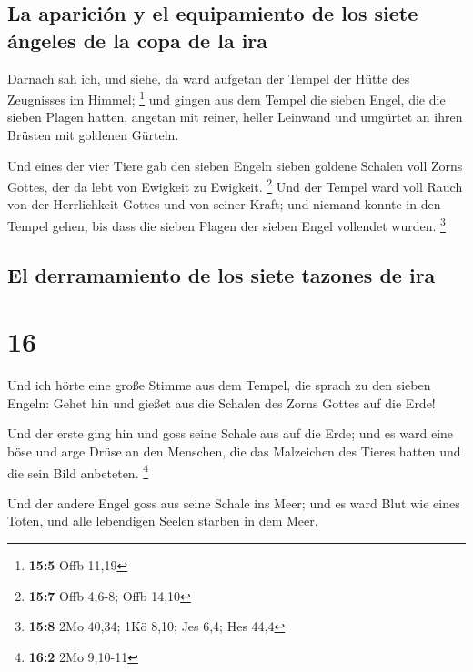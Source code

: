 \hypertarget{la-apariciuxf3n-y-el-equipamiento-de-los-siete-uxe1ngeles-de-la-copa-de-la-ira}{%
\subsection{La aparición y el equipamiento de los siete ángeles de la
copa de la
ira}\label{la-apariciuxf3n-y-el-equipamiento-de-los-siete-uxe1ngeles-de-la-copa-de-la-ira}}

 Darnach sah ich, und siehe, da ward aufgetan der Tempel
der Hütte des Zeugnisses im Himmel; \footnote{\textbf{15:5} Offb 11,19}
 und gingen aus dem Tempel die sieben Engel, die die
sieben Plagen hatten, angetan mit reiner, heller Leinwand und umgürtet
an ihren Brüsten mit goldenen Gürteln.

 Und eines der vier Tiere gab den sieben Engeln sieben
goldene Schalen voll Zorns Gottes, der da lebt von Ewigkeit zu Ewigkeit.
\footnote{\textbf{15:7} Offb 4,6-8; Offb 14,10}  Und der
Tempel ward voll Rauch von der Herrlichkeit Gottes und von seiner Kraft;
und niemand konnte in den Tempel gehen, bis dass die sieben Plagen der
sieben Engel vollendet wurden. \footnote{\textbf{15:8} 2Mo 40,34; 1Kö
  8,10; Jes 6,4; Hes 44,4}

\hypertarget{el-derramamiento-de-los-siete-tazones-de-ira}{%
\subsection{El derramamiento de los siete tazones de
ira}\label{el-derramamiento-de-los-siete-tazones-de-ira}}

\hypertarget{section-15}{%
\section{16}\label{section-15}}

 Und ich hörte eine große Stimme aus dem Tempel, die
sprach zu den sieben Engeln: Gehet hin und gießet aus die Schalen des
Zorns Gottes auf die Erde!

 Und der erste ging hin und goss seine Schale aus auf die
Erde; und es ward eine böse und arge Drüse an den Menschen, die das
Malzeichen des Tieres hatten und die sein Bild anbeteten. \footnote{\textbf{16:2}
  2Mo 9,10-11}

 Und der andere Engel goss aus seine Schale ins Meer; und
es ward Blut wie eines Toten, und alle lebendigen Seelen starben in dem
Meer.

